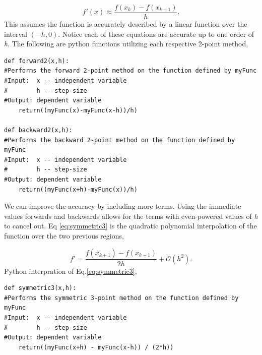 \documentclass[10pt]{article}
\begin{document}
\begin{equation}
\label{eq:backward2}
	f'(x) \approx \frac{f(x_k)-f(x_{k-1})}{h}.
\end{equation}
This assumes the function is accurately described by a linear function over the interval $(-h,0)$. Notice each of these equations are accurate up to one order of \textit{h}. The following are python functions utilizing each respective 2-point method,
\begin{lstlisting}
def forward2(x,h):
#Performs the forward 2-point method on the function defined by myFunc
#Input:  x -- independent variable
#        h -- step-size
#Output: dependent variable
    return((myFunc(x)-myFunc(x-h))/h)

def backward2(x,h):
#Performs the backward 2-point method on the function defined by myFunc
#Input:  x -- independent variable
#        h -- step-size
#Output: dependent variable
    return((myFunc(x+h)-myFunc(x))/h)
\end{lstlisting}

We can improve the accuracy by including more terms. Using the immediate values forwards and backwards allows for the terms with even-powered values of \textit{h} to cancel out. Eq \ref{eq:symmetric3} is the quadratic polynomial interpolation of the function over the two previous regions,

\begin{equation}
\label{eq:symmetric3}
	f'=\frac{f(x_{k+1})-f(x_{k-1})}{2h} + \mathcal{O}(h^2).
\end{equation}
Python interpration of Eq.\ref{eq:symmetric3},
\begin{lstlisting}
def symmetric3(x,h):
#Performs the symmetric 3-point method on the function defined by myFunc
#Input:  x -- independent variable
#        h -- step-size
#Output: dependent variable
    return((myFunc(x+h) - myFunc(x-h)) / (2*h))
\end{lstlisting}
\end{document}
